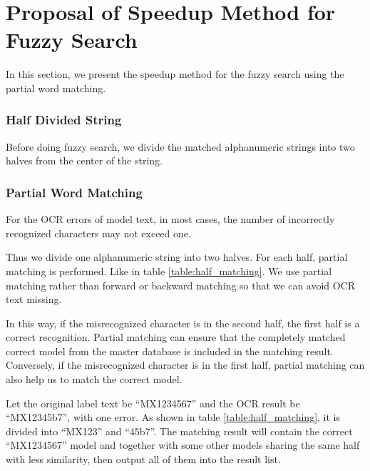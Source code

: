 \documentclass[technicalreport]{ieicej}
\begin{document}
\section{Proposal of Speedup Method for Fuzzy Search}
\label{sec:speedup}
In this section, we present the speedup method for the fuzzy search using the partial word matching.

        \subsubsection{Half Divided String}
            Before doing fuzzy search, we divide the matched alphanumeric strings into two halves from the center of the string.

        \subsubsection{Partial Word Matching}

            For the OCR errors of model text, in most cases, the number of incorrectly recognized characters may not exceed one.

            Thus we divide one alphanumeric string into two halves. For each half, partial matching is performed. Like in table \ref{table:half_matching}. We use partial matching rather than forward or backward matching so that we can avoid OCR text missing.

            In this way, if the misrecognized character is in the second half, the first half is a correct recognition. Partial matching can ensure that the completely matched correct model from the master database is included in the matching result. Conversely, if the misrecognized character is in the first half, partial matching can also help us to match the correct model.
            
            Let the original label text be “MX1234567” and the OCR result be “MX12345b7”, with one error. As shown in table \ref{table:half_matching}, it is divided into “MX123” and “45b7”. The matching result will contain the correct “MX1234567” model and together with some other models sharing the same half with less similarity, then output all of them into the result list.
\end{document}
